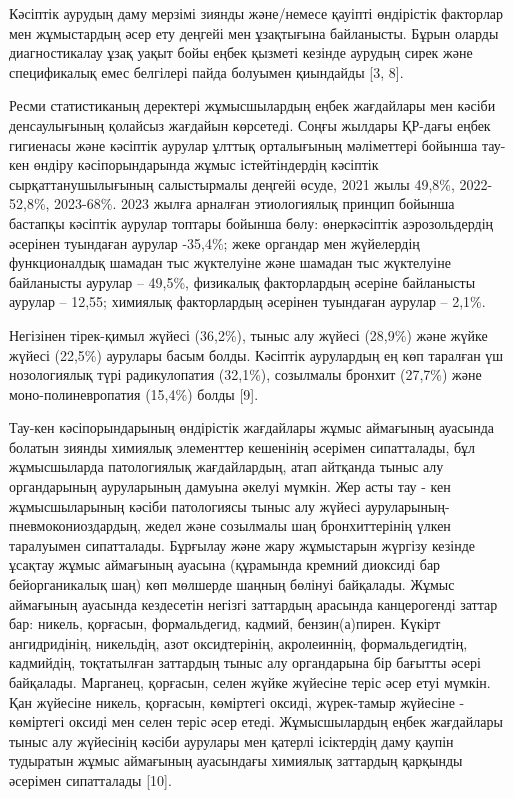 \begin{multicols}{2}
Кәсіптік аурудың даму мерзімі зиянды және/немесе қауіпті өндірістік
факторлар мен жұмыстардың әсер ету деңгейі мен ұзақтығына байланысты.
Бұрын оларды диагностикалау ұзақ уақыт бойы еңбек қызметі кезінде
аурудың сирек және спецификалық емес белгілері пайда болуымен қиындайды
{[}3, 8{]}.

Ресми статистиканың деректері жұмысшылардың еңбек жағдайлары мен кәсіби
денсаулығының қолайсыз жағдайын көрсетеді. Соңғы жылдары ҚР-дағы еңбек
гигиенасы және кәсіптік аурулар ұлттық орталығының мәліметтері бойынша
тау-кен өндіру кәсіпорындарында жұмыс істейтіндердің кәсіптік
сырқаттанушылығының салыстырмалы деңгейі өсуде, 2021 жылы 49,8\%,
2022-52,8\%, 2023-68\%. 2023 жылға арналған этиологиялық принцип бойынша
бастапқы кәсіптік аурулар топтары бойынша бөлу: өнеркәсіптік
аэрозольдердің әсерінен туындаған аурулар -35,4\%; жеке органдар мен
жүйелердің функционалдық шамадан тыс жүктелуіне және шамадан тыс
жүктелуіне байланысты аурулар -- 49,5\%, физикалық факторлардың әсеріне
байланысты аурулар -- 12,55; химиялық факторлардың әсерінен туындаған
аурулар -- 2,1\%.

Негізінен тірек-қимыл жүйесі (36,2\%), тыныс алу жүйесі (28,9\%) және
жүйке жүйесі (22,5\%) аурулары басым болды. Кәсіптік аурулардың ең көп
таралған үш нозологиялық түрі радикулопатия (32,1\%), созылмалы бронхит
(27,7\%) және моно-полиневропатия (15,4\%) болды {[}9{]}.

Тау-кен кәсіпорындарының өндірістік жағдайлары жұмыс аймағының ауасында
болатын зиянды химиялық элементтер кешенінің әсерімен сипатталады, бұл
жұмысшыларда патологиялық жағдайлардың, атап айтқанда тыныс алу
органдарының ауруларының дамуына әкелуі мүмкін. Жер асты тау - кен
жұмысшыларының кәсіби патологиясы тыныс алу жүйесі
ауруларының-пневмокониоздардың, жедел және созылмалы шаң бронхиттерінің
үлкен таралуымен сипатталады. Бұрғылау және жару жұмыстарын жүргізу
кезінде ұсақтау жұмыс аймағының ауасына (құрамында кремний диоксиді бар
бейорганикалық шаң) көп мөлшерде шаңның бөлінуі байқалады. Жұмыс
аймағының ауасында кездесетін негізгі заттардың арасында канцерогенді
заттар бар: никель, қорғасын, формальдегид, кадмий, бензин(а)пирен.
Күкірт ангидридінің, никельдің, азот оксидтерінің, акролеиннің,
формальдегидтің, кадмийдің, тоқтатылған заттардың тыныс алу органдарына
бір бағытты әсері байқалады. Марганец, қорғасын, селен жүйке жүйесіне
теріс әсер етуі мүмкін. Қан жүйесіне никель, қорғасын, көміртегі оксиді,
жүрек-тамыр жүйесіне - көміртегі оксиді мен селен теріс әсер етеді.
Жұмысшылардың еңбек жағдайлары тыныс алу жүйесінің кәсіби аурулары мен
қатерлі ісіктердің даму қаупін тудыратын жұмыс аймағының ауасындағы
химиялық заттардың қарқынды әсерімен сипатталады {[}10{]}.


\end{multicols}
